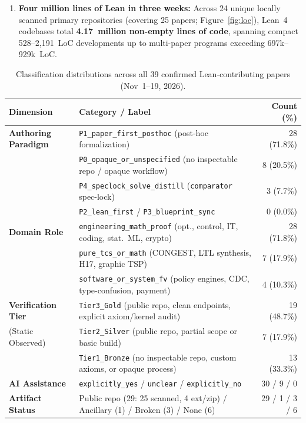 \documentclass[11pt,letterpaper]{article}
\begin{document}
\begin{enumerate}
  \item \textbf{Four million lines of Lean in three weeks:} Across 24 unique locally scanned primary repositories (covering 25 papers; Figure~\ref{fig:loc}), Lean~4 codebases total \textbf{4.17~million non-empty lines of code}, spanning compact 528--2,191~LoC developments up to multi-paper programs exceeding 697k--929k~LoC.
\end{enumerate}

\begin{table}[t]
\centering
\caption{Classification distributions across all 39 confirmed Lean-contributing papers (Nov~1--19, 2026).}
\label{tab:distributions}
\small
\begin{tabularx}{\textwidth}{lXr}
\toprule
\textbf{Dimension} & \textbf{Category / Label} & \textbf{Count (\%)} \\
\midrule
\textbf{Authoring Paradigm} & \texttt{P1\_paper\_first\_posthoc} (post-hoc formalization) & 28 (71.8\%) \\
 & \texttt{P0\_opaque\_or\_unspecified} (no inspectable repo / opaque workflow) & 8 (20.5\%) \\
 & \texttt{P4\_speclock\_solve\_distill} (\texttt{comparator} spec-lock) & 3 (7.7\%) \\
 & \texttt{P2\_lean\_first} / \texttt{P3\_blueprint\_sync} & 0 (0.0\%) \\
\midrule
\textbf{Domain Role} & \texttt{engineering\_math\_proof} (opt., control, IT, coding, stat.\ ML, crypto) & 28 (71.8\%) \\
 & \texttt{pure\_tcs\_or\_math} (CONGEST, LTL synthesis, H17, graphic TSP) & 7 (17.9\%) \\
 & \texttt{software\_or\_system\_fv} (policy engines, CDC, type-confusion, payment) & 4 (10.3\%) \\
\midrule
\textbf{Verification Tier} & \texttt{Tier3\_Gold} (public repo, clean endpoints, explicit axiom/kernel audit) & 19 (48.7\%) \\
(Static Observed) & \texttt{Tier2\_Silver} (public repo, partial scope or basic build) & 7 (17.9\%) \\
 & \texttt{Tier1\_Bronze} (no inspectable repo, custom axioms, or opaque process) & 13 (33.3\%) \\
\midrule
\textbf{AI Assistance} & \texttt{explicitly\_yes} / \texttt{unclear} / \texttt{explicitly\_no} & 30 / 9 / 0 \\
\textbf{Artifact Status} & Public repo (29: 25 scanned, 4 ext/zip) / Ancillary (1) / Broken (3) / None (6) & 29 / 1 / 3 / 6 \\

\end{tabularx}
\end{table}
\end{document}
